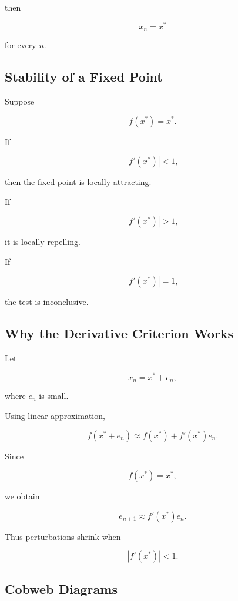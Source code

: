 then

\[
x_n=x^*
\]

for every \(n\).

\subsection{Stability of a Fixed Point}
\label{subsec:fixed-point-stability-map}

Suppose

\[
f(x^*)=x^*.
\]

If

\[
\boxed{
|f'(x^*)|<1,
}
\]

then the fixed point is locally attracting.

If

\[
\boxed{
|f'(x^*)|>1,
}
\]

it is locally repelling.

If

\[
|f'(x^*)|=1,
\]

the test is inconclusive.

\subsection{Why the Derivative Criterion Works}
\label{subsec:fixed-point-derivative-reason}

Let

\[
x_n=x^*+e_n,
\]

where \(e_n\) is small.

Using linear approximation,

\[
f(x^*+e_n)
\approx
f(x^*)
+
f'(x^*)e_n.
\]

Since

\[
f(x^*)=x^*,
\]

we obtain

\[
\boxed{
e_{n+1}
\approx
f'(x^*)e_n.
}
\]

Thus perturbations shrink when

\[
|f'(x^*)|<1.
\]

\subsection{Cobweb Diagrams}
\label{subsec:cobweb-diagrams}

